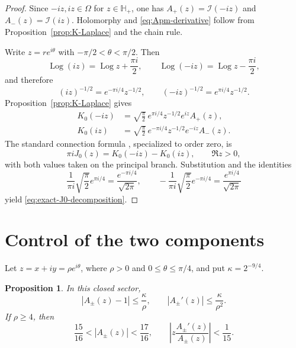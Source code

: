 \documentclass[11pt]{amsart}
\numberwithin{equation}{section}
\DeclareMathOperator{\Log}{Log}
\newtheorem{proposition}[theorem]{Proposition}
\theoremstyle{definition}
\theoremstyle{remark}
\newcommand{\Hplus}{\mathbb H_+}
\begin{document}
\begin{proof}
Since $-iz,iz\in\Omega$ for $z\in\Hplus$, one has
$A_+(z)=\mathcal I(-iz)$ and $A_-(z)=\mathcal I(iz)$.  Holomorphy and
\eqref{eq:Apm-derivative} follow from Proposition~\ref{prop:K-Laplace} and
the chain rule.

Write $z=re^{i\theta}$ with $-\pi/2<\theta<\pi/2$.  Then
\[
   \Log(iz)=\Log z+\frac{\pi i}{2},
   \qquad
   \Log(-iz)=\Log z-\frac{\pi i}{2},
\]
and therefore
\begin{equation*}
   (iz)^{-1/2}=e^{-\pi i/4}z^{-1/2},
   \qquad
   (-iz)^{-1/2}=e^{\pi i/4}z^{-1/2}.
\end{equation*}
Proposition~\ref{prop:K-Laplace} gives
\[
\begin{aligned}
   K_0(-iz)&=\sqrt{\frac\pi2}\,e^{\pi i/4}z^{-1/2}e^{iz}A_+(z),\\
   K_0(iz)&=\sqrt{\frac\pi2}\,e^{-\pi i/4}z^{-1/2}e^{-iz}A_-(z).
\end{aligned}
\]
The standard connection formula \cite[10.27.9]{DLMF}, specialized to order
zero, is
\[
   \pi iJ_0(z)=K_0(-iz)-K_0(iz),
   \qquad \Re z>0,
\]
with both values taken on the principal branch.  Substitution and the identities
\[
   \frac{1}{\pi i}\sqrt{\frac\pi2}e^{\pi i/4}
   =\frac{e^{-\pi i/4}}{\sqrt{2\pi}},
   \qquad
   -\frac{1}{\pi i}\sqrt{\frac\pi2}e^{-\pi i/4}
   =\frac{e^{\pi i/4}}{\sqrt{2\pi}}
\]
yield \eqref{eq:exact-J0-decomposition}.
\end{proof}

\section{Control of the two components}\label{sec:components}

Let $z=x+iy=\rho e^{i\theta}$, where $\rho>0$ and
$0\le\theta\le\pi/4$, and put $\kappa=2^{-9/4}$.

\begin{proposition}\label{prop:A-uniform-estimates}
In this closed sector,
\begin{equation}\label{eq:A-uniform-estimates}
   |A_\pm(z)-1|\le\frac{\kappa}{\rho},
   \qquad
   |A_\pm'(z)|\le\frac{\kappa}{\rho^2}.
\end{equation}
If $\rho\ge4$, then
\begin{equation}\label{eq:A-modulus-bounds}
   \frac{15}{16}<|A_\pm(z)|<\frac{17}{16},
   \qquad
   \left|z\frac{A_\pm'(z)}{A_\pm(z)}\right|<\frac1{15}.
\end{equation}
\end{proposition}
\end{document}
